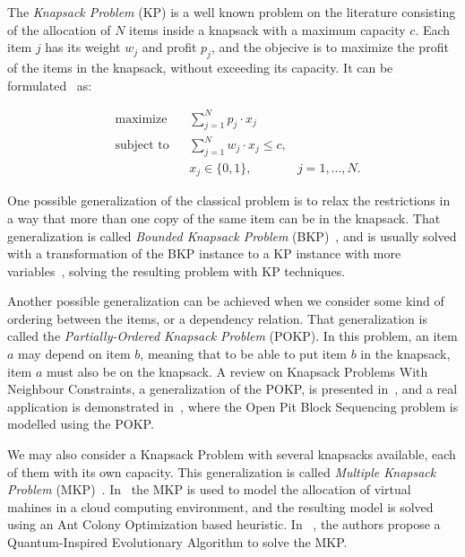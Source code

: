 The \textit{Knapsack Problem} (KP) is a well known problem on the literature consisting of the allocation of $N$ items inside a 
knapsack with a maximum capacity $c$. Each item $j$ has its weight $w_j$ and profit $p_j$, and the objecive is to 
maximize the profit of the items in the knapsack, without exceeding its capacity. It can be formulated~\cite{pisinger1995} as:

\begin{equation}
\label{eq:knap01}
  \begin{aligned}
    & \text{maximize}
    & & \sum_{j=1}^{N} p_j \cdot x_j \\
    & \text{subject to} 
    & & \sum_{j=1}^{N} w_j \cdot x_j \leq c, \\
    & & & x_j \in \{0,1\}, &j = 1,...,N.
  \end{aligned}
\end{equation}

One possible generalization of the classical problem is to relax the restrictions in a way that more than one 
copy of the same item can be in the knapsack. That generalization is called \textit{Bounded Knapsack Problem} (BKP)~\cite{pisinger1995}, 
and is usually solved with a transformation of the BKP instance to a KP instance with more variables~\cite{kellerer2004knapsack}, 
solving the resulting problem with KP techniques.

Another possible generalization can be achieved when we consider some kind of ordering between the items, or a dependency relation. 
That generalization is called the \textit{Partially-Ordered Knapsack Problem} (POKP)\cite{pok2002}. In this problem, an item $a$ may depend on item $b$, meaning
that to be able to put item $b$ in the knapsack, item $a$ must also be on the knapsack. A review on Knapsack Problems With Neighbour Constraints, a generalization of the POKP, is presented
in~\cite{borradaile2012}, and a real application is demonstrated in~\cite{lambert2014}, where the Open Pit Block Sequencing problem is modelled using the POKP.

We may also consider a Knapsack Problem with several knapsacks available, each of them with its own capacity. This generalization is called 
\textit{Multiple Knapsack Problem} (MKP)~\cite{kellerer2004knapsack}. In~\cite{amarante2013} the MKP is used to model the allocation of virtual mahines in a 
cloud computing environment, and the resulting model is solved using an Ant Colony Optimization based heuristic. 
In ~\cite{patvardhan2014}, the authors propose a Quantum-Inspired Evolutionary Algorithm to solve the MKP.

